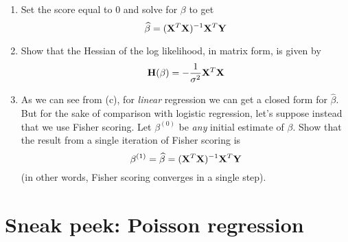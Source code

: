\documentclass[11pt]{article}
\begin{document}
\begin{enumerate}
\begin{enumerate}
\item Set the score equal to 0 and solve for $\beta$ to get
$$\widehat{\beta} = ({\bf X}^T {\bf X})^{-1} {\bf X}^T {\bf Y}$$

\item Show that the Hessian of the log likelihood, in matrix form, is given by
$${\bf H}(\beta) = -\frac{1}{\sigma^2} {\bf X}^T {\bf X}$$

\item As we can see from (c), for \textit{linear} regression we can get a closed form for $\widehat{\beta}$. But for the sake of comparison with logistic regression, let's suppose instead that we use Fisher scoring. Let $\beta^{(0)}$ be \textit{any} initial estimate of $\beta$. Show that the result from a single iteration of Fisher scoring is
$$\beta^{(1)} = \widehat{\beta} = ({\bf X}^T {\bf X})^{-1} {\bf X}^T {\bf Y}$$
(in other words, Fisher scoring converges in a single step).
\end{enumerate}

\end{enumerate}

\section*{Sneak peek: Poisson regression}
\end{document}
